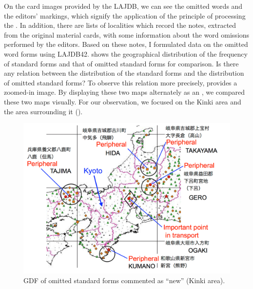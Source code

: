 \documentclass[output=paper]{LSP/langsci}
\begin{document}
On the card images provided by the LAJDB, we can see the omitted words and the editors’ markings, which signify the application of the principle of processing the . In addition, there are lists of localities which record the notes, extracted from the original material cards, with some information about the word omissions performed by the editors. Based on these notes, I formulated data on the omitted word forms using LAJDB42.  shows the geographical distribution of the frequency of standard forms and that of omitted standard forms for comparison. Is there any relation between the distribution of the standard forms and the distribution of omitted standard forms? To observe this relation more precisely,  provides a zoomed-in image. By displaying these two maps alternately as an , we compared these two maps visually. For our observation, we focused on the Kinki area and the area surrounding it (). 

\begin{figure}
\includegraphics[height=.4\textheight]{illustrations/kuma_fig18}
\caption{GDF of omitted standard forms commented as “new” (Kinki area).}          
\label{fig:18}
\end{figure}
\end{document}
